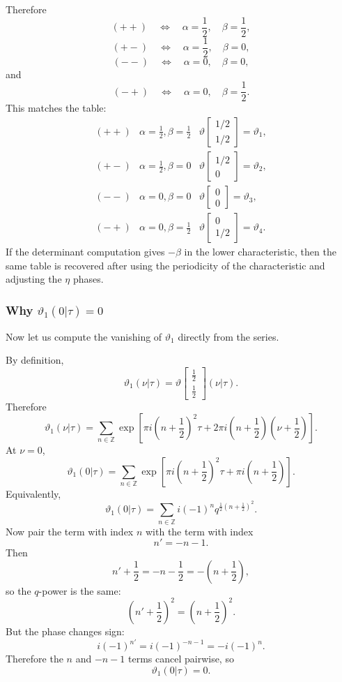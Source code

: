 \documentclass[
  10pt,
  a4paper,
  openany]{book}
\begin{document}
Therefore \[
(++)
\quad\Longleftrightarrow\quad
\alpha=\frac{1}{2},
\quad
\beta=\frac{1}{2},
\] \[
(+-)
\quad\Longleftrightarrow\quad
\alpha=\frac{1}{2},
\quad
\beta=0,
\] \[
(--)
\quad\Longleftrightarrow\quad
\alpha=0,
\quad
\beta=0,
\] and \[
(-+)
\quad\Longleftrightarrow\quad
\alpha=0,
\quad
\beta=\frac{1}{2}.
\] This matches the table: \[
\begin{array}{lll}
(++) & \alpha=\frac{1}{2},\beta=\frac{1}{2}
& \vartheta\begin{bmatrix}
1/2\\
1/2
\end{bmatrix}
=\vartheta_1,\\
(+-) & \alpha=\frac{1}{2},\beta=0
& \vartheta\begin{bmatrix}
1/2\\
0
\end{bmatrix}
=\vartheta_2,\\
(--) & \alpha=0,\beta=0
& \vartheta\begin{bmatrix}
0\\
0
\end{bmatrix}
=\vartheta_3,\\
(-+) & \alpha=0,\beta=\frac{1}{2}
& \vartheta\begin{bmatrix}
0\\
1/2
\end{bmatrix}
=\vartheta_4.
\end{array}
\] If the determinant computation gives \(-\beta\) in the lower
characteristic, then the same table is recovered after using the
periodicity of the characteristic and adjusting the \(\eta\) phases.

\subsubsection{\texorpdfstring{Why
\(\vartheta_1(0|\tau)=0\)}{Why \textbackslash vartheta\_1(0\textbar\textbackslash tau)=0}}\label{why-vartheta_10tau0}

Now let us compute the vanishing of \(\vartheta_1\) directly from the
series.

By definition, \[
\vartheta_1(\nu|\tau)
=
\vartheta\begin{bmatrix}
\frac{1}{2}\\
\frac{1}{2}
\end{bmatrix}(\nu|\tau).
\] Therefore \[
\vartheta_1(\nu|\tau)
=
\sum_{n\in\mathbb Z}
\exp\left[
\pi i\left(n+\frac{1}{2}\right)^2\tau
+
2\pi i\left(n+\frac{1}{2}\right)
\left(\nu+\frac{1}{2}\right)
\right].
\] At \(\nu=0\), \[
\vartheta_1(0|\tau)
=
\sum_{n\in\mathbb Z}
\exp\left[
\pi i\left(n+\frac{1}{2}\right)^2\tau
+
\pi i\left(n+\frac{1}{2}\right)
\right].
\] Equivalently, \[
\vartheta_1(0|\tau)
=
\sum_{n\in\mathbb Z}
i(-1)^n
q^{\frac{1}{2}\left(n+\frac{1}{2}\right)^2}.
\] Now pair the term with index \(n\) with the term with index \[
n'=-n-1.
\] Then \[
n'+\frac{1}{2}
=
-n-\frac{1}{2}
=
-\left(n+\frac{1}{2}\right),
\] so the \(q\)-power is the same: \[
\left(n'+\frac{1}{2}\right)^2
=
\left(n+\frac{1}{2}\right)^2.
\] But the phase changes sign: \[
i(-1)^{n'}
=
i(-1)^{-n-1}
=
-i(-1)^n.
\] Therefore the \(n\) and \(-n-1\) terms cancel pairwise, so \[
\boxed{
\vartheta_1(0|\tau)=0.
}
\]
\end{document}
